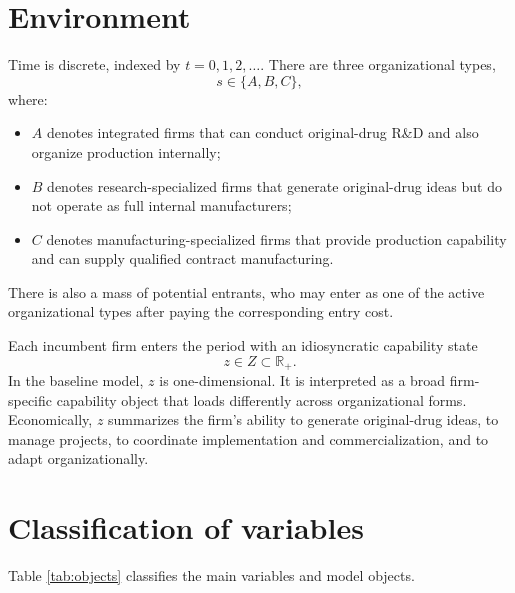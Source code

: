 \documentclass[12pt]{ctexart}
\begin{document}
\section{Environment}

Time is discrete, indexed by $t=0,1,2,\dots$. There are three organizational types,
\[
s\in\{A,B,C\},
\]
where:

\begin{itemize}[leftmargin=2em]
    \item $A$ denotes integrated firms that can conduct original-drug R\&D and also
    organize production internally;
    \item $B$ denotes research-specialized firms that generate original-drug ideas but
    do not operate as full internal manufacturers;
    \item $C$ denotes manufacturing-specialized firms that provide production capability
    and can supply qualified contract manufacturing.
\end{itemize}

There is also a mass of potential entrants, who may enter as one of the active organizational
types after paying the corresponding entry cost.

Each incumbent firm enters the period with an idiosyncratic capability state
\[
z\in Z\subset \mathbb{R}_+.
\]
In the baseline model, $z$ is one-dimensional. It is interpreted as a broad firm-specific
capability object that loads differently across organizational forms. Economically, $z$
summarizes the firm's ability to generate original-drug ideas, to manage projects,
to coordinate implementation and commercialization, and to adapt organizationally.

\section{Classification of variables}

Table \ref{tab:objects} classifies the main variables and model objects.
\end{document}
